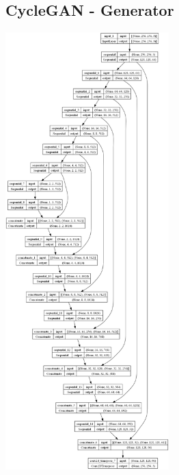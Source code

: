 \documentclass{article}
\begin{document}
\begin{multicols}{2}
\subsection{CycleGAN - Generator \vspace{0.25\baselineskip}}
    \includegraphics[width=0.475\textwidth]{../imgs/cyclegan_generator.png}

\end{multicols}
\end{document}
